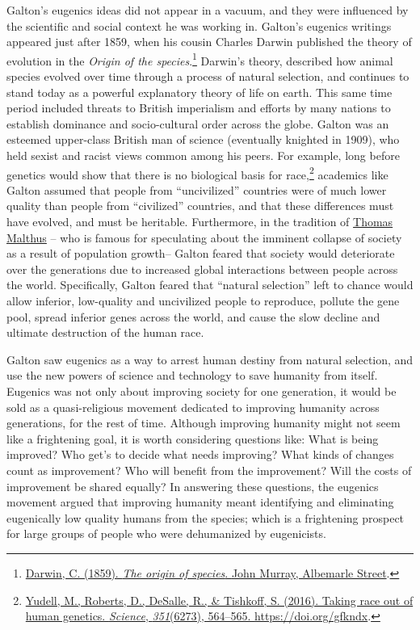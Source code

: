 \documentclass[
  oneside,
  12pt]{crumpbook}
\begin{document}
Galton's eugenics ideas did not appear in a vacuum, and they were influenced by the scientific and social context he was working in. Galton's eugenics writings appeared just after 1859, when his cousin Charles Darwin published the theory of evolution in the \emph{Origin of the species}.\footnote{\protect\hyperlink{ref-darwinOriginSpecies1859}{Darwin, C. (1859). \emph{The origin of species}. {John Murray, Albemarle Street}}.} Darwin's theory, described how animal species evolved over time through a process of natural selection, and continues to stand today as a powerful explanatory theory of life on earth. This same time period included threats to British imperialism and efforts by many nations to establish dominance and socio-cultural order across the globe. Galton was an esteemed upper-class British man of science (eventually knighted in 1909), who held sexist and racist views common among his peers. For example, long before genetics would show that there is no biological basis for race,\footnote{\protect\hyperlink{ref-yudellTakingRaceOut2016}{Yudell, M., Roberts, D., DeSalle, R., \& Tishkoff, S. (2016). Taking race out of human genetics. \emph{Science}, \emph{351}(6273), 564--565. \url{https://doi.org/gfkndx}}.} academics like Galton assumed that people from ``uncivilized'' countries were of much lower quality than people from ``civilized'' countries, and that these differences must have evolved, and must be heritable. Furthermore, in the tradition of \href{https://en.wikipedia.org/wiki/Thomas_Robert_Malthus}{Thomas Malthus} -- who is famous for speculating about the imminent collapse of society as a result of population growth-- Galton feared that society would deteriorate over the generations due to increased global interactions between people across the world. Specifically, Galton feared that ``natural selection'' left to chance would allow inferior, low-quality and uncivilized people to reproduce, pollute the gene pool, spread inferior genes across the world, and cause the slow decline and ultimate destruction of the human race.

Galton saw eugenics as a way to arrest human destiny from natural selection, and use the new powers of science and technology to save humanity from itself. Eugenics was not only about improving society for one generation, it would be sold as a quasi-religious movement dedicated to improving humanity across generations, for the rest of time. Although improving humanity might not seem like a frightening goal, it is worth considering questions like: What is being improved? Who get's to decide what needs improving? What kinds of changes count as improvement? Who will benefit from the improvement? Will the costs of improvement be shared equally? In answering these questions, the eugenics movement argued that improving humanity meant identifying and eliminating eugenically low quality humans from the species; which is a frightening prospect for large groups of people who were dehumanized by eugenicists.
\end{document}
